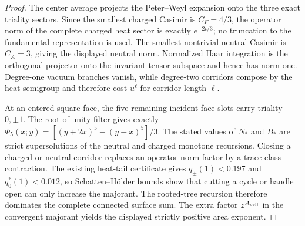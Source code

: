 \documentclass[12pt,a4paper]{article}
\begin{document}
\begin{proof}
The center average projects the Peter--Weyl expansion onto the three exact
triality sectors.  Since the smallest charged Casimir is \(C_F=4/3\), the
operator norm of the complete charged heat sector is exactly \(e^{-2t/3}\);
no truncation to the fundamental representation is used.  The smallest
nontrivial neutral Casimir is \(C_A=3\), giving the displayed neutral norm.
Normalized Haar integration is the orthogonal projector onto the invariant
tensor subspace and hence has norm one.  Degree-one vacuum branches vanish,
while degree-two corridors compose by the heat semigroup and therefore cost
\(u^\ell\) for corridor length \(\ell\).

At an entered square face, the five remaining incident-face slots carry
triality \(0,\pm1\).  The root-of-unity filter gives exactly
\(\Phi_5(x;y)=[(y+2x)^5-(y-x)^5]/3\).  The stated values of \(N_*\) and \(B_*\)
are strict supersolutions of the neutral and charged monotone recursions.
Closing a charged or neutral corridor replaces an operator-norm factor by a
trace-class contraction.  The existing heat-tail certificate gives
\(q_{\pm}(1)<0.197\) and \(q_0^*(1)<0.012\), so Schatten--H\"older bounds show
that cutting a cycle or handle open can only increase the majorant.  The
rooted-tree recursion therefore dominates the complete connected surface
sum.  The extra factor \(z^{A_{\rm cell}}\) in the convergent majorant yields
the displayed strictly positive area exponent.
\end{proof}
\end{document}
